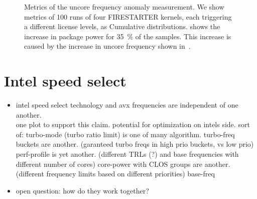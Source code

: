 \begin{figure}[t!]
{        \label{fig:c}%
    }\hfill
    \caption{Metrics of the uncore frequency anomaly measurement.
    We show metrics of \SI{100}{} runs of four FIRESTARTER kernels, each triggering a different license levels, as Cumulative distributions.
     shows the increase in package power for \SI{35}{\percent} of the samples.
    This increase is caused by the increase in uncore frequency shown in~.}
    \label{fig:avx-frequency-uncore-anomaly}
\end{figure}


\section{Intel speed select}
\label{sec:isst}

\begin{itemize}
    \item intel speed select technology and avx frequencies are independent of one another.\\
    one plot to support this claim. potential for optimization on intels side.
    sort of: turbo-mode (turbo ratio limit) is one of many algorithm.
    turbo-freq buckets are another. (garanteed turbo freqs in high prio buckets, vs low prio)
    perf-profile is yet another. (different TRLs (?) and base frequencies with different number of cores)
    core-power with CLOS groups are another. (different frequency limits based on different priorities)
    base-freq
    \item open question: how do they work together?
\end{itemize}



